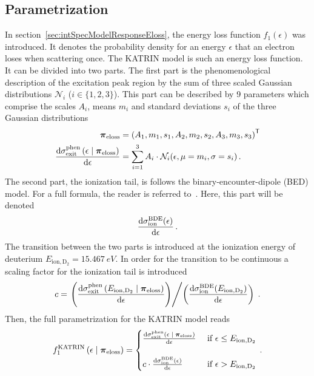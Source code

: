 \subsection{Parametrization}
In section~\ref{sec:intSpecModelResponseEloss}, the energy loss function $f_1(\epsilon)$ was introduced. It denotes the probability density for an energy $\epsilon$ that an electron loses when scattering once. The KATRIN model is such an energy loss function. It can be divided into two parts. The first part is the phenomenological description of the excitation peak region by the sum of three scaled Gaussian distributions $\mathcal{N}_i$ ($i \in \{1,2,3\}$). This part can be described by 9 parameters which comprise the scales $A_i$, means $m_i$ and standard deviations $s_i$ of the three Gaussian distributions\footnotemark[2]
\newcommand{\katrinElossPhen}[1]{
	\frac{
		\d\sigma_\mathrm{exit}^\mathrm{phen}\giventhat*{#1}{\nuisanceParamVec_\mathrm{eloss}}
	}{
		\d \epsilon
	}
}
\begin{align}
\nuisanceParamVec_\mathrm{eloss} &= 
\transp{\left(
	A_1, m_1, s_1, 
	A_2, m_2, s_2, 
	A_3, m_3, s_3
	\right)} \\
\katrinElossPhen{\epsilon} &=
\sum_{i=1}^3 A_i \cdot \mathcal{N}_i(\epsilon, \mu=m_i, \sigma=s_i)
\fullstop
\end{align}
The second part, the ionization tail, is follows the binary-encounter-dipole (BED) model. For a full formula, the reader is referred to~\cite{Kim1994}. Here, this part will be denoted
\newcommand{\katrinElossBDE}[1]{
	\frac{
		\d \sigma_\mathrm{ion}^\mathrm{BDE}(#1)
	}{
		\d \epsilon
	}
}
\begin{equation}
	\katrinElossBDE{\epsilon}
	\fullstop
\end{equation}
\newcommand{\ionEnergyDeu}{E_\mathrm{ion,D_2}}
The transition between the two parts is introduced at the ionization energy of deuterium $\ionEnergyDeu = \SI{15.467}{eV}$. In order for the transition to be continuous a scaling factor for the ionization tail is introduced
\begin{equation}
c = \left.	
	\left(
		\katrinElossPhen{\ionEnergyDeu}
	\right)
\middle/
	\left(
		\katrinElossBDE{\ionEnergyDeu}
	\right)
\right.
\fullstop
\end{equation}
Then, the full parametrization for the KATRIN model reads\footnotemark[2]
\begin{equation}
	f_1^\mathrm{KATRIN}
	\giventhat*{\epsilon}{\nuisanceParamVec_\mathrm{eloss}} = 
	\begin{cases}
	\katrinElossPhen{\epsilon}
	&\text{ if } \epsilon \leq E_\mathrm{ion,D_2} \\
	\vphantom{.} & \\
	c \cdot \katrinElossBDE{\epsilon} 
	&\text{ if } \epsilon > E_\mathrm{ion,D_2}
	\end{cases}
	\fullstop
\end{equation}

